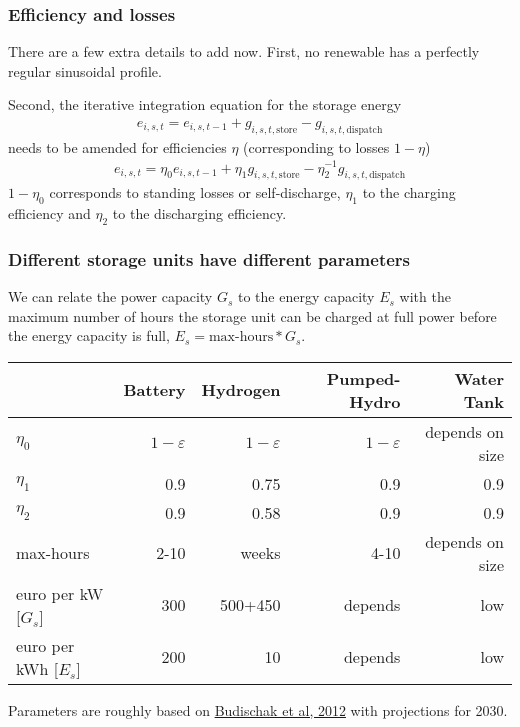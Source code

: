 \documentclass[10pt,aspectratio=169,dvipsnames]{beamer}
\newcommand{\ra}[1]{\renewcommand{\arraystretch}{#1}}
\begin{document}
\begin{frame}
  \frametitle{Efficiency and losses}

  There are a few extra details to add now. First, no renewable has a perfectly regular sinusoidal profile.

  Second, the iterative integration equation for the storage energy
  \begin{align*}
    e_{i,s,t} = e_{i,s,t-1} + g_{i,s,t,\textrm{store}} -  g_{i,s,t,\textrm{dispatch}}
  \end{align*}
  needs to be amended for \alert{efficiencies} $\eta$ (corresponding to \alert{losses} $1-\eta$)
  \begin{align*}
    e_{i,s,t} = \eta_0e_{i,s,t-1} + \eta_1g_{i,s,t,\textrm{store}} -  \eta_2^{-1} g_{i,s,t,\textrm{dispatch}}
  \end{align*}
  $1-\eta_0$ corresponds to \alert{standing losses} or \alert{self-discharge}, $\eta_1$ to the \alert{charging efficiency} and $\eta_2$ to the \alert{discharging efficiency}.

\end{frame}


\begin{frame}
  \frametitle{Different storage units have different parameters}

  We can relate the power capacity $G_s$ to the energy capacity $E_s$
  with the maximum number of hours the storage unit can be charged at full
power before the energy capacity is full, $E_s =
  \textrm{max-hours}*G_s$.

  \ra{1.05}
  \begin{table}[!t]
    \begin{tabular}{lrrrr}
      \toprule
      & Battery & Hydrogen & Pumped-Hydro & Water Tank\\
      \midrule
      $\eta_0$ & $1-\varepsilon$ & $1-\varepsilon$ & $1-\varepsilon$ & depends on size  \\
      $\eta_1$ & 0.9 & 0.75 & 0.9 & 0.9 \\
      $\eta_2$ & 0.9 & 0.58 & 0.9 & 0.9 \\
      max-hours & 2-10 & weeks & 4-10 & depends on size \\
      euro per kW [$G_s$] &300 &500+450 & depends& low \\
      euro per kWh [$E_s$] &200 & 10 &depends&low \\
      \bottomrule
    \end{tabular}
  \end{table}
Parameters are roughly based on
\href{http://www.sciencedirect.com/science/article/pii/S0378775312014759}{Budischak
  et al, 2012} with projections for 2030.


\end{frame}
\end{document}
